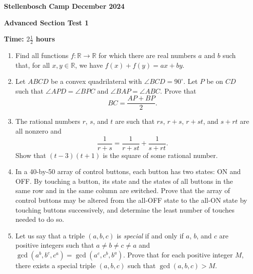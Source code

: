 \documentclass[12pt]{article}
\begin{document}
\begin{center}
\textbf{Stellenbosch Camp December 2024}

\textbf{Advanced Section Test 1}

\textbf{Time: \(2 \frac{1}{2}\) hours}
\end{center}
\begin{enumerate}

\item Find all functions \(f: \mathbb{R} \rightarrow \mathbb{R}\) for which there are real numbers \(a\) and \(b\) such that, for all \(x, y \in \mathbb{R}\), we have \(f(x) + f(y) = ax + by\).

\item Let $ABCD$ be a convex quadrilateral with $\angle BCD = 90^{\circ}$. Let $P$ be on $CD$ such that $\angle APD = \angle BPC$ and $\angle BAP = \angle ABC$. Prove that \[BC = \frac{AP + BP}{2}.\]

\item The rational numbers \(r\), \(s\), and \(t\) are such that \(rs\), \(r + s\), \(r + st\), and \(s + rt\) are all nonzero and
\[\frac{1}{r + s} = \frac{1}{r + st} + \frac{1}{s + rt}.\]
Show that \((t - 3)(t + 1)\) is the square of some rational number.

\item In a 40-by-50 array of control buttons, each button has two states: ON and OFF. By touching a button, its state and the states of all buttons in the same row and in the same column are switched. Prove that the array of control buttons may be altered from the all-OFF state to the all-ON state by touching buttons successively, and determine the least number of touches needed to do so.

\item Let us say that a triple \((a, b, c)\) is \emph{special} if and only if \(a\), \(b\), and \(c\) are positive integers such that \(a \neq b \neq c \neq a\) and \(\gcd(a^{b}, b^{c}, c^{a}) = \gcd(a^{c}, c^{b}, b^{a})\). Prove that for each positive integer \(M\), there exists a special triple \((a, b, c)\) such that \(\gcd(a, b, c) > M\).
\end{enumerate}
\end{document}

